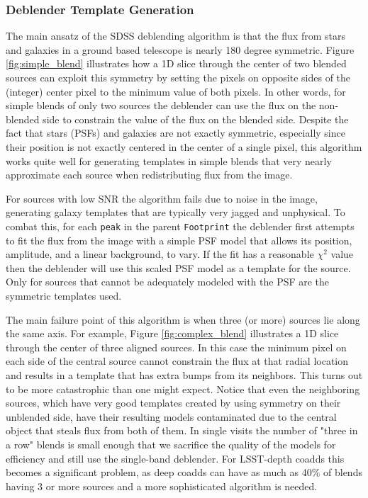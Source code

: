 \subsubsection{Deblender Template Generation}

The main ansatz of the SDSS deblending algorithm is that the flux from stars and galaxies in a ground based telescope is nearly 180 degree symmetric.
Figure \ref{fig:simple_blend} illustrates how a 1D slice through the center of two blended sources can exploit this symmetry by setting the pixels on opposite sides of the (integer) center pixel to the minimum value of both pixels.
In other words, for simple blends of only two sources the deblender can use the flux on the non-blended side to constrain the value of the flux on the blended side.
Despite the fact that stars (PSFs) and galaxies are not exactly symmetric, especially since their position is not exactly centered in the center of a single pixel, this algorithm works quite well for generating templates in simple blends that very nearly approximate each source when redistributing flux from the image.

For sources with low SNR the algorithm fails due to noise in the image, generating galaxy templates that are typically very jagged and unphysical.
To combat this, for each \texttt{peak} in the parent \texttt{Footprint} the deblender first attempts to fit the flux from the image with a simple PSF model that allows its position, amplitude, and a linear background, to vary.
If the fit has a reasonable $\chi^2$ value then the deblender will use this scaled PSF model as a template for the source.
Only for sources that cannot be adequately modeled with the PSF are the symmetric templates used.

The main failure point of this algorithm is when three (or more) sources lie along the same axis.
For example, Figure \ref{fig:complex_blend} illustrates a 1D slice through the center of three aligned sources.
In this case the minimum pixel on each side of the central source cannot constrain the flux at that radial location and results in a template that has extra bumps from its neighbors.
This turns out to be more catastrophic than one might expect.
Notice that even the neighboring sources, which have very good templates created by using symmetry on their unblended side, have their resulting models contaminated due to the central object that steals flux from both of them.
In single visits the number of "three in a row" blends is small enough that we sacrifice the quality of the models for efficiency and still use the single-band deblender.
For LSST-depth coadds this becomes a significant problem, as deep coadds can have as much as 40\% of blends having 3 or more sources and a more sophisticated algorithm is needed.

